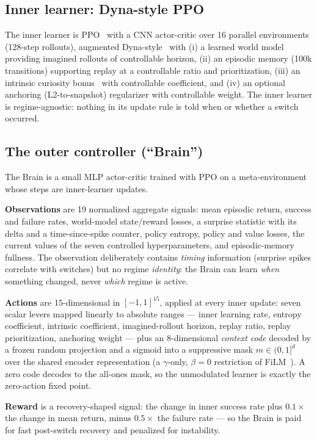 \documentclass[11pt]{article}
\begin{document}
\subsection{Inner learner: Dyna-style PPO}
The inner learner is PPO~\citep{schulman2017ppo} with a CNN actor-critic over
16 parallel environments (128-step rollouts), augmented Dyna-style~\citep{sutton1990dyna}
with (i) a learned world model providing imagined rollouts of controllable
horizon, (ii) an episodic memory (100k transitions) supporting replay at a
controllable ratio and prioritization, (iii) an intrinsic curiosity
bonus~\citep{pathak2017curiosity} with controllable coefficient, and (iv) an
optional anchoring (L2-to-snapshot) regularizer with controllable weight. The
inner learner is regime-agnostic: nothing in its update rule is told when or
whether a switch occurred.

\subsection{The outer controller (``Brain'')}
The Brain is a small MLP actor-critic trained with PPO on a meta-environment
whose steps are inner-learner updates.

\textbf{Observations} are 19 normalized aggregate signals: mean episodic
return, success and failure rates, world-model state/reward losses, a
surprise statistic with its delta and a time-since-spike counter, policy
entropy, policy and value losses, the current values of the seven controlled
hyperparameters, and episodic-memory fullness. The observation deliberately
contains \emph{timing} information (surprise spikes correlate with switches)
but no regime \emph{identity}: the Brain can learn \emph{when} something
changed, never \emph{which} regime is active.

\textbf{Actions} are 15-dimensional in $[-1,1]^{15}$, applied at every inner
update: seven scalar levers mapped linearly to absolute ranges --- inner
learning rate, entropy coefficient, intrinsic coefficient, imagined-rollout
horizon, replay ratio, replay prioritization, anchoring weight --- plus an
8-dimensional \emph{context code} decoded by a frozen random projection and a
sigmoid into a suppressive mask $m \in (0,1]^{d}$ over the shared encoder
representation (a $\gamma$-only, $\beta{=}0$ restriction of
FiLM~\citep{perez2018film}). A zero code decodes to the all-ones mask, so the
unmodulated learner is exactly the zero-action fixed point.

\textbf{Reward} is a recovery-shaped signal: the change in inner success rate
plus $0.1\times$ the change in mean return, minus $0.5\times$ the failure
rate --- so the Brain is paid for fast post-switch recovery and penalized for
instability.
\end{document}
